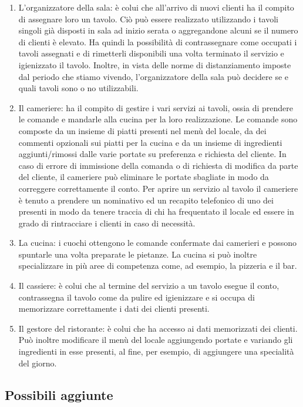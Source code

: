 \documentclass{article}
\begin{document}
\begin{enumerate}
\item L'organizzatore della sala: \`e colui che all'arrivo di nuovi clienti ha il compito di assegnare loro un tavolo. Ci\`o pu\`o essere realizzato utilizzando i tavoli singoli gi\`a disposti in sala ad inizio serata o aggregandone alcuni se il numero di clienti \`e  elevato. Ha quindi la possibilit\`a di contrassegnare come occupati i tavoli assegnati e di rimetterli disponibili una volta terminato il servizio e igienizzato il tavolo. Inoltre, in vista delle norme di distanziamento imposte dal periodo che stiamo vivendo, l'organizzatore della sala pu\`o decidere se e quali tavoli sono o no utilizzabili. 
\item Il cameriere: ha il compito di gestire i vari servizi ai tavoli, ossia di prendere le comande e mandarle alla cucina per la loro realizzazione. Le comande sono composte da un insieme di piatti presenti nel men\`u del locale, da dei commenti opzionali sui piatti per la cucina e da un insieme di ingredienti aggiunti/rimossi dalle varie portate su preferenza e richiesta del cliente. In caso di  errore di immissione della comanda o di richiesta di modifica da parte del cliente, il cameriere pu\`o eliminare le portate sbagliate in modo da correggere correttamente il conto. Per aprire un servizio al tavolo il cameriere \`e tenuto a prendere un nominativo ed un recapito telefonico di uno dei presenti in modo da tenere traccia di chi ha frequentato il locale ed essere in grado di rintracciare i clienti in caso di necessit\`a. 
\item La cucina: i cuochi ottengono le comande confermate dai camerieri e possono spuntarle una volta preparate le pietanze. La cucina si pu\`o inoltre specializzare in pi\`u aree di competenza come, ad esempio, la pizzeria e il bar. 
\item Il cassiere: \`e colui che al termine del servizio a un tavolo esegue il conto, contrassegna il tavolo come da pulire ed igienizzare e si occupa di memorizzare correttamente i dati dei clienti presenti.
\item Il gestore del ristorante: \`e colui che ha accesso ai dati memorizzati dei clienti. Pu\`o inoltre modificare il men\`u del locale aggiungendo portate e variando gli ingredienti in esse presenti, al fine, per esempio, di aggiungere una specialit\`a del giorno.
\end{enumerate}

\subsection{Possibili aggiunte}
\end{document}
